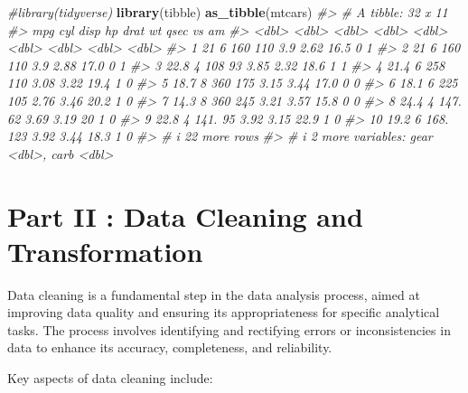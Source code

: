 \documentclass[
]{book}
\newenvironment{Shaded}{\begin{snugshade}}{\end{snugshade}}
\newcommand{\CommentTok}[1]{\textcolor[rgb]{0.56,0.35,0.01}{\textit{#1}}}
\newcommand{\FunctionTok}[1]{\textcolor[rgb]{0.13,0.29,0.53}{\textbf{#1}}}
\newcommand{\NormalTok}[1]{#1}
\begin{document}
\begin{Shaded}
\begin{Highlighting}[]
\CommentTok{\#library(tidyverse)}
\FunctionTok{library}\NormalTok{(tibble)}
\FunctionTok{as\_tibble}\NormalTok{(mtcars)}
\CommentTok{\#\textgreater{} \# A tibble: 32 x 11}
\CommentTok{\#\textgreater{}      mpg   cyl  disp    hp  drat    wt  qsec    vs    am}
\CommentTok{\#\textgreater{}    \textless{}dbl\textgreater{} \textless{}dbl\textgreater{} \textless{}dbl\textgreater{} \textless{}dbl\textgreater{} \textless{}dbl\textgreater{} \textless{}dbl\textgreater{} \textless{}dbl\textgreater{} \textless{}dbl\textgreater{} \textless{}dbl\textgreater{}}
\CommentTok{\#\textgreater{}  1  21       6  160    110  3.9   2.62  16.5     0     1}
\CommentTok{\#\textgreater{}  2  21       6  160    110  3.9   2.88  17.0     0     1}
\CommentTok{\#\textgreater{}  3  22.8     4  108     93  3.85  2.32  18.6     1     1}
\CommentTok{\#\textgreater{}  4  21.4     6  258    110  3.08  3.22  19.4     1     0}
\CommentTok{\#\textgreater{}  5  18.7     8  360    175  3.15  3.44  17.0     0     0}
\CommentTok{\#\textgreater{}  6  18.1     6  225    105  2.76  3.46  20.2     1     0}
\CommentTok{\#\textgreater{}  7  14.3     8  360    245  3.21  3.57  15.8     0     0}
\CommentTok{\#\textgreater{}  8  24.4     4  147.    62  3.69  3.19  20       1     0}
\CommentTok{\#\textgreater{}  9  22.8     4  141.    95  3.92  3.15  22.9     1     0}
\CommentTok{\#\textgreater{} 10  19.2     6  168.   123  3.92  3.44  18.3     1     0}
\CommentTok{\#\textgreater{} \# i 22 more rows}
\CommentTok{\#\textgreater{} \# i 2 more variables: gear \textless{}dbl\textgreater{}, carb \textless{}dbl\textgreater{}}
\end{Highlighting}
\end{Shaded}

\section*{Part II : Data Cleaning and Transformation}\label{part-ii-data-cleaning-and-transformation}

Data cleaning is a fundamental step in the data analysis process, aimed
at improving data quality and ensuring its appropriateness for specific
analytical tasks. The process involves identifying and rectifying errors
or inconsistencies in data to enhance its accuracy, completeness, and
reliability.

Key aspects of data cleaning include:
\end{document}
